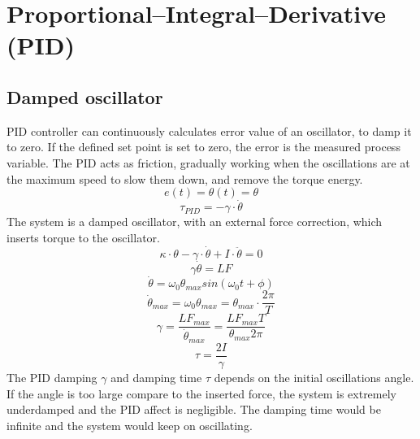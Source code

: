 \documentclass[\main/master.tex]{subfiles}
\begin{document}
\section{Proportional–Integral–Derivative (PID)}
\subsection{Damped oscillator}
PID controller can continuously calculates error value of an oscillator, to damp it to zero. If the defined set point is set to zero, the error is the measured process variable. The PID acts as friction, gradually working when the oscillations are at the maximum speed to slow them down, and remove the torque energy.
\begin{equation}
e(t) = \theta(t) = \theta   \label{eqn:error}
\end{equation}
\begin{equation}
\tau_{PID} = -\gamma\cdot\dot{\theta}   \label{eqn:friction_torque}
\end{equation}
The system is a damped oscillator, with an external force correction, which inserts torque to the oscillator.
\begin{equation}
\kappa\cdot\theta - \gamma\cdot\dot{\theta}  + I\cdot\ddot{\theta} = 0   \label{eqn:damped__pid_motion_equation}
\end{equation}
\begin{equation}
\gamma\dot{\theta}  = LF   \label{eqn:damped__pid_motion_equation}
\end{equation}
\begin{equation}
\dot{\theta} = \omega_0\theta_{max}sin(\omega_0 t +\phi)    \label{eqn:undamped_motion_equation_1}
\end{equation}
\begin{equation}
\dot{\theta}_{max} = \omega_0\theta_{max} = \theta_{max}\cdot\frac{2\pi}{T}    \label{eqn:undamped_motion_equation_2}
\end{equation}
\begin{equation}
\gamma  = \frac{LF_{max}}{\dot{\theta}_{max}} =\frac{LF_{max}T}{\theta_{max}2\pi}    \label{eqn:damped_pid_motion_equation}
\end{equation}
\begin{equation}
\tau =  \frac{2I}{\gamma}  \label{eqn:damping_time}
\end{equation}
The PID damping $\gamma$ and damping time $\tau$ depends on the initial oscillations angle. If the angle is too large compare to the inserted force, the system is extremely underdamped and the PID affect is negligible. The damping time would be infinite and the system would keep on oscillating.
\end{document}
